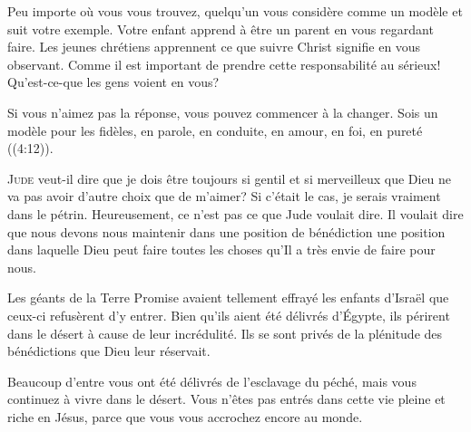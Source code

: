 Peu importe où vous vous trouvez, quelqu'un vous considère comme un modèle
 et suit votre exemple. Votre enfant apprend à être un parent en vous
 regardant faire. Les jeunes chrétiens apprennent ce que suivre Christ
 signifie en vous observant. Comme il est important de prendre
 cette responsabilité au sérieux! Qu'est-ce-que les gens voient en vous? 

Si vous n'aimez pas la réponse, vous pouvez commencer à la changer.
 \Og Sois un modèle pour les fidèles, en parole, en conduite,
 en amour, en foi, en pureté \Fg{} ((4:12)). 

\dvrule







\lettrine{J}{ude} veut-il dire que je dois être toujours 
 si gentil et si merveilleux que Dieu ne va pas avoir
 d'autre choix que de m'aimer?
 Si c'était le cas, je serais vraiment dans le pétrin.
 Heureusement, ce n'est pas ce que Jude voulait dire.
 Il voulait dire que nous devons nous maintenir
 dans une position de bénédiction
 \ocadr une position dans laquelle Dieu peut faire toutes les choses
 qu'Il a très envie de faire pour nous. 

Les géants de la Terre Promise avaient tellement effrayé
 les enfants d'Israël que ceux-ci refusèrent d'y entrer.
 Bien qu'ils aient été délivrés d'Égypte, 
 ils périrent dans le désert à cause de leur incrédulité.
 Ils se sont privés de la plénitude des bénédictions
 que Dieu leur réservait.


Beaucoup d'entre vous ont été délivrés de l'esclavage du péché,
 mais vous continuez à vivre dans le désert.
 Vous n'êtes pas entrés dans cette vie pleine et riche en Jésus,
 parce que vous vous accrochez encore au monde. 


